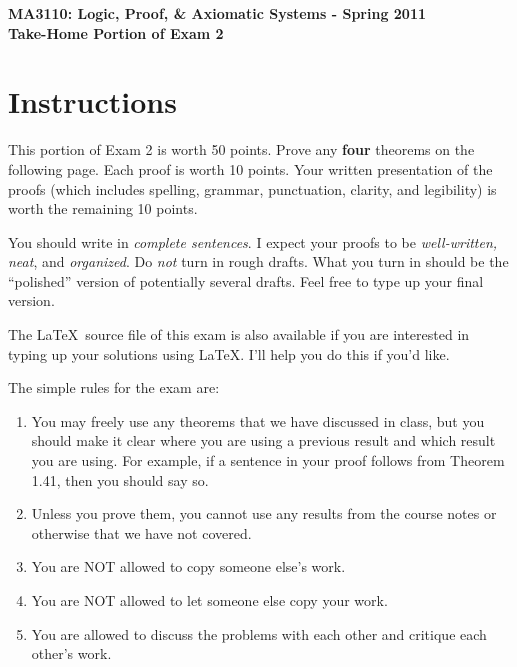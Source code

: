 \documentclass[11pt]{article}
\theoremstyle{definition}
\begin{document}
\begin{center}

{\Large\bf MA3110: Logic, Proof, \& Axiomatic Systems - Spring 2011}\\
\smallskip
{\Large\bf Take-Home Portion of Exam 2}

\bigskip


\end{center}

\setlength{\fboxsep}{10pt}

\section*{Instructions}

This portion of Exam 2 is worth 50 points.  Prove any \textbf{four} theorems on the following page.  Each proof is worth 10 points.  Your written presentation of the proofs (which includes spelling, grammar, punctuation, clarity, and legibility) is worth the remaining 10 points.

\bigskip

You should write in \emph{complete sentences}.  I expect your proofs to be \emph{well-written, neat}, and \emph{organized}.  Do \emph{not} turn in rough drafts.  What you turn in should be the ``polished'' version of potentially several drafts.  Feel free to type up your final version.  

\bigskip

The \LaTeX\ source file of this exam is also available if you are interested in typing up your solutions using \LaTeX.  I'll help you do this if you'd like.

\bigskip

The simple rules for the exam are:

\begin{enumerate}
\item You may freely use any theorems that we have discussed in class, but you should make it clear where you are using a previous result and which result you are using.  For example, if a sentence in your proof follows from Theorem 1.41, then you should say so.
\item Unless you prove them, you cannot use any results from the course notes or otherwise that we have not covered.
\item You are NOT allowed to copy someone else's work.
\item You are NOT allowed to let someone else copy your work.
\item You are allowed to discuss the problems with each other and critique each other's work.
\end{enumerate}
\end{document}

